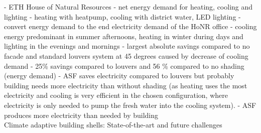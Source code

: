 	- ETH House of Natural Resources	
	- net energy demand for heating, cooling and lighting
	- heating with heatpump, cooling with district water, LED lighting
	- convert energy demand to the end electricity demand of the HoNR office
	- cooling energy predominant in summer afternoons, heating in winter during days and lighting in the evenings and mornings
	- largest absolute savings compared to no facade and standard louvers system at 45 degrees  caused by decrease of cooling demand
	- 25\% savings compared to louvers and 56 \% compared to no shading (energy demand)
	- ASF saves electricity compared to louvers but probably building needs more electricity than without shading (as heating uses the most electricity and cooling is very efficient in the chosen configuration, where electricity is only needed to pump the fresh water into the cooling system).
	- ASF produces more electricity than needed by building\\
	


Climate adaptive building shells: State-of-the-art and future challenges \cite{loonen2013climate}\\ 

